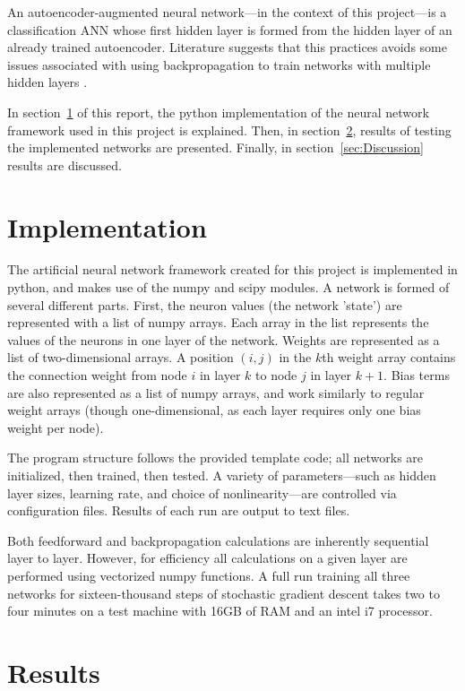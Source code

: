 \documentclass[english]{tktltiki}
\begin{document}
An autoencoder-augmented neural network---in the context of this project---is a classification ANN whose first hidden layer is formed from the hidden layer of an already trained autoencoder.  Literature suggests that this practices avoids some issues associated with using backpropagation to train networks with multiple hidden layers \cite{DeepTut}.

In section~\ref{sec:Implementation} of this report, the python implementation of the neural network framework used in this project is explained.  Then, in section~\ref{sec:Results}, results of testing the implemented networks are presented.  Finally, in section~\ref{sec:Discussion} results are discussed.

\section{Implementation}
\label{sec:Implementation}

The artificial neural network framework created for this project is implemented in python, and makes use of the numpy and scipy modules.  A network is formed of several different parts.  First, the neuron values (the network 'state') are represented with a list of numpy arrays.  Each array in the list represents the values of the neurons in one layer of the network.  Weights are represented as a list of two-dimensional arrays.  A position $(i,j)$ in the $k$th weight array contains the connection weight from node $i$ in layer $k$ to node $j$ in layer $k+1$.  Bias terms are also represented as a list of numpy arrays, and work similarly to regular weight arrays (though one-dimensional, as each layer requires only one bias weight per node).

The program structure follows the provided template code; all networks are initialized, then trained, then tested.  A variety of parameters---such as hidden layer sizes, learning rate, and choice of nonlinearity---are controlled via configuration files.  Results of each run are output to text files.  

Both feedforward and backpropagation calculations are inherently sequential layer to layer.  However, for efficiency all calculations on a given layer are performed using vectorized numpy functions.  A full run training all three networks for sixteen-thousand steps of stochastic gradient descent takes two to four minutes on a test machine with 16GB of RAM and an intel i7 processor.  

\section{Results}
\label{sec:Results}
\end{document}
